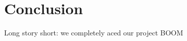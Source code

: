 \section{Conclusion}
     \pagestyle{mario}
     
Long story short: we completely aced our project BOOM